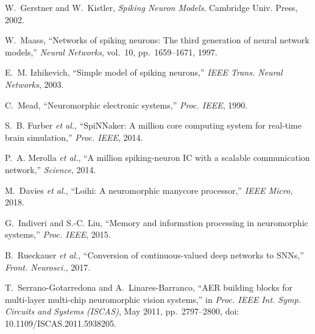 \documentclass[10pt,onecolumn]{IEEEtran}
\begin{document}
\begin{thebibliography}{10}

W.~Gerstner and W.~Kistler, \emph{Spiking Neuron Models}. Cambridge Univ. Press, 2002.

W.~Maass, ``Networks of spiking neurons: The third generation of neural network models,'' \emph{Neural Networks}, vol.~10, pp.~1659--1671, 1997.

E.~M. Izhikevich, ``Simple model of spiking neurons,'' \emph{IEEE Trans. Neural Networks}, 2003.

C.~Mead, ``Neuromorphic electronic systems,'' \emph{Proc. IEEE}, 1990.

S.~B. Furber \emph{et al.}, ``SpiNNaker: A million core computing system for real-time brain simulation,'' \emph{Proc. IEEE}, 2014.

P.~A. Merolla \emph{et al.}, ``A million spiking-neuron IC with a scalable communication network,'' \emph{Science}, 2014.

M.~Davies \emph{et al.}, ``Loihi: A neuromorphic manycore processor,'' \emph{IEEE Micro}, 2018.

G.~Indiveri and S.-C. Liu, ``Memory and information processing in neuromorphic systems,'' \emph{Proc. IEEE}, 2015.

B.~Rueckauer \emph{et al.}, ``Conversion of continuous-valued deep networks to SNNs,'' \emph{Front. Neurosci.}, 2017.

T.~Serrano-Gotarredona and A.~Linares-Barranco, ``AER building blocks for multi-layer multi-chip neuromorphic vision systems,'' in \emph{Proc. IEEE Int. Symp. Circuits and Systems (ISCAS)}, May 2011, pp.~2797--2800, doi: 10.1109/ISCAS.2011.5938205.

\end{thebibliography}
\end{document}
